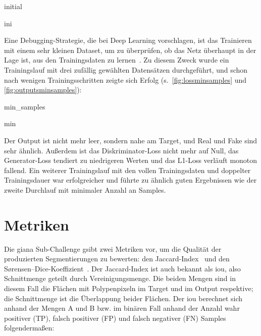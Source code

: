 \begin{outputs}{initial}
	\caption{Initialer Trainingslauf: ein Datensatz und die dazugehörige Ausgabe des Netzes.}
	\label{fig:outputsini}
\end{outputs}

\begin{losseswoiou}{ini}
	\caption[Verläufe des initialen Trainingslaufs]{Verläufe des initialen Trainingslaufs (x: Trainingsschritt, y: Wert)}
	\label{fig:lossini}
\end{losseswoiou}

Eine Debugging-Strategie, die \citeauthor{Goodfellow.2016} bei Deep Learning vorschlagen, ist das Trainieren mit einem sehr kleinen Dataset, um zu überprüfen, ob das Netz überhaupt in der Lage ist, aus den Trainingsdaten zu lernen~\cite{Goodfellow.2016}.
Zu diesem Zweck wurde ein Trainingslauf mit drei zufällig gewählten Datensätzen durchgeführt, und schon nach wenigen Trainingsschritten zeigte sich Erfolg (s.~\autoref{fig:lossminsamples} und \autoref{fig:outputsminsamples}):

\begin{losseswoiou}{min_samples}
	\caption{Verläufe des Durchlaufs mit minimaler Anzahl Samples}
	\label{fig:lossminsamples}
\end{losseswoiou}

\begin{outputs}{min}
	\caption{Datensatz und Ausgabe des Durchlaufs mit minimaler Anzahl Samples}
	\label{fig:outputsminsamples}
\end{outputs}

Der Output ist nicht mehr leer, sondern nahe am Target, und Real und Fake sind sehr ähnlich.
Außerdem ist das Diskriminator-Loss nicht mehr auf Null, das Generator-Loss tendiert zu niedrigeren Werten und das L1-Loss verläuft monoton fallend.
Ein weiterer Trainingslauf mit den vollen Trainingsdaten und doppelter Trainingsdauer war erfolgreicher und führte zu ähnlich guten Ergebnissen wie der zweite Durchlauf mit minimaler Anzahl an Samples.



\section{Metriken}

Die \gls{giana} Sub-Challenge gsibt zwei Metriken vor, um die Qualität der produzierten Segmentierungen zu bewerten: den Jaccard-Index~\cite{Jaccard.1901} und den Sørensen–Dice-Koeffizient~\cite{Srensen.1948,Dice.1945}.
Der Jaccard-Index ist auch bekannt als \gls{iou}, also Schnittmenge geteilt durch Vereinigungsmenge.
Die beiden Mengen sind in diesem Fall die Flächen mit Polypenpixeln im Target und im Output respektive; die Schnittmenge ist die Überlappung beider Flächen.
Der \gls{iou} berechnet sich anhand der Mengen A und B bzw. im binären Fall anhand der Anzahl wahr positiver (TP), falsch positiver (FP) und falsch negativer (FN) Samples folgendermaßen:


